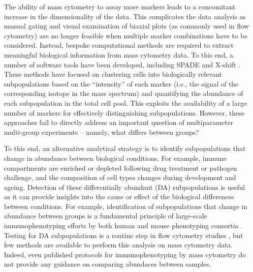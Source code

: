 \documentclass{article}
\begin{document}
The ability of mass cytometry to assay more markers leads to a concomitant increase in the dimensionality of the data.
This complicates the data analysis as manual gating and visual examination of biaxial plots (as commonly used in flow cytometry) are no longer feasible when multiple marker combinations have to be considered.
Instead, bespoke computational methods are required to extract meaningful biological information from mass cytometry data. 
To this end, a number of software tools have been developed, including SPADE \cite{qiu2011extracting} and X-shift \cite{samusik2016automated}.
These methods have focused on clustering cells into biologically relevant subpopulations based on the ``intensity'' of each marker (i.e., the signal of the corresponding isotope in the mass spectrum) and quantifying the abundance of each subpopulation in the total cell pool.
This exploits the availability of a large number of markers for effectively distinguishing subpopulations.
However, these approaches fail to directly address an important question of multiparameter multi-group experiments -- namely, what differs between groups?

To this end, an alternative analytical strategy is to identify subpopulations that change in abundance between biological conditions.
For example, immune compartments are enriched or depleted following drug treatment or pathogen challenge, and the composition of cell types changes during development and ageing.
Detection of these differentially abundant (DA) subpopulations is useful as it can provide insights into the cause or effect of the biological differences between conditions.
For example, identification of subpopulations that change in abundance between groups is a fundamental principle of large-scale immunophenotyping efforts by both human and mouse phenotyping consortia \cite{maecker2012standardizing,brown2012international,finak2016standardizing}.
Testing for DA subpopulations is a routine step in flow cytometry studies \cite{saeys2016computational,mittag2011recent}, but few methods are available to perform this analysis on mass cytometry data.
Indeed, even published protocols for immunophenotyping by mass cytometry \cite{leipold2015multiparameter,leelatian2015characterizing} do not provide any guidance on comparing abundaces between samples.
\end{document}
